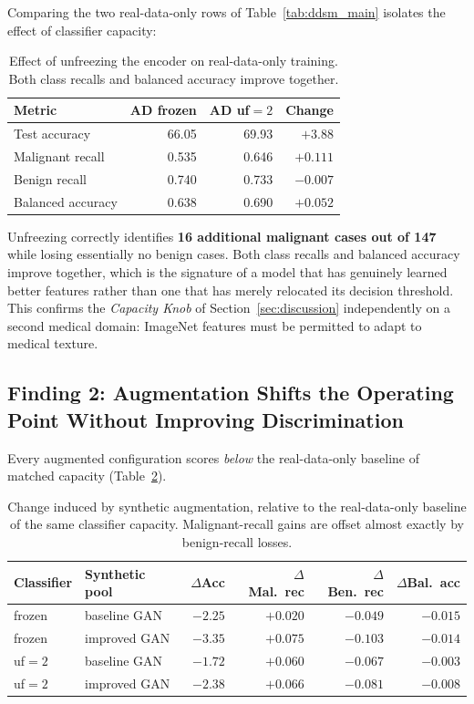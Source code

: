 Comparing the two real-data-only rows of Table~\ref{tab:ddsm_main} isolates the effect of classifier
capacity:

\begin{table}[h]
\centering
\caption{Effect of unfreezing the encoder on real-data-only training. Both class recalls and balanced
accuracy improve together.}
\label{tab:ddsm_unfreeze}
\begin{tabular}{lrrr}
\toprule
\textbf{Metric} & \textbf{AD frozen} & \textbf{AD uf${=}2$} & \textbf{Change} \\
\midrule
Test accuracy      & 66.05 & 69.93 & $+3.88$ \\
Malignant recall   & 0.535 & 0.646 & $\mathbf{+0.111}$ \\
Benign recall      & 0.740 & 0.733 & $-0.007$ \\
Balanced accuracy  & 0.638 & 0.690 & $\mathbf{+0.052}$ \\
\bottomrule
\end{tabular}
\end{table}

Unfreezing correctly identifies \textbf{16 additional malignant cases out of 147} while losing
essentially no benign cases. Both class recalls and balanced accuracy improve together, which is the
signature of a model that has genuinely learned better features rather than one that has merely
relocated its decision threshold. This confirms the \emph{Capacity Knob} of
Section~\ref{sec:discussion} independently on a second medical domain: ImageNet features must be
permitted to adapt to medical texture.

\subsection{Finding 2: Augmentation Shifts the Operating Point Without Improving Discrimination}

Every augmented configuration scores \emph{below} the real-data-only baseline of matched capacity
(Table~\ref{tab:ddsm_deltas}).

\begin{table}[h]
\centering
\caption{Change induced by synthetic augmentation, relative to the real-data-only baseline of the
same classifier capacity. Malignant-recall gains are offset almost exactly by benign-recall losses.}
\label{tab:ddsm_deltas}
\begin{tabular}{llrrrr}
\toprule
\textbf{Classifier} & \textbf{Synthetic pool} & $\Delta$\textbf{Acc} &
$\Delta$\textbf{Mal.\ rec} & $\Delta$\textbf{Ben.\ rec} & $\Delta$\textbf{Bal.\ acc} \\
\midrule
frozen   & baseline GAN & $-2.25$ & $+0.020$ & $-0.049$ & $-0.015$ \\
frozen   & improved GAN & $-3.35$ & $+0.075$ & $-0.103$ & $-0.014$ \\
uf${=}2$ & baseline GAN & $-1.72$ & $+0.060$ & $-0.067$ & $-0.003$ \\
uf${=}2$ & improved GAN & $-2.38$ & $+0.066$ & $-0.081$ & $-0.008$ \\
\bottomrule
\end{tabular}
\end{table}

